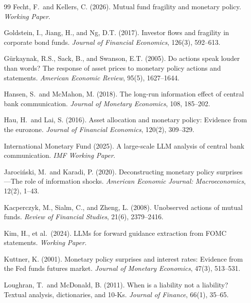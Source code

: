 \documentclass[11pt,a4paper]{article}
\begin{document}
\begin{thebibliography}{99}
Fecht, F.\ and Kellers, C. (2026). Mutual fund fragility and monetary policy. \textit{Working Paper}.

Goldstein, I., Jiang, H., and Ng, D.T. (2017). Investor flows and fragility in corporate bond funds. \textit{Journal of Financial Economics}, 126(3), 592--613.

G\"urkaynak, R.S., Sack, B., and Swanson, E.T. (2005). Do actions speak louder than words? The response of asset prices to monetary policy actions and statements. \textit{American Economic Review}, 95(5), 1627--1644.

Hansen, S.\ and McMahon, M. (2018). The long-run information effect of central bank communication. \textit{Journal of Monetary Economics}, 108, 185--202.

Hau, H.\ and Lai, S. (2016). Asset allocation and monetary policy: Evidence from the eurozone. \textit{Journal of Financial Economics}, 120(2), 309--329.

International Monetary Fund (2025). A large-scale LLM analysis of central bank communication. \textit{IMF Working Paper}.

Jaroci\'nski, M.\ and Karadi, P. (2020). Deconstructing monetary policy surprises---The role of information shocks. \textit{American Economic Journal: Macroeconomics}, 12(2), 1--43.

Kacperczyk, M., Sialm, C., and Zheng, L. (2008). Unobserved actions of mutual funds. \textit{Review of Financial Studies}, 21(6), 2379--2416.

Kim, H., et al.\ (2024). LLMs for forward guidance extraction from FOMC statements. \textit{Working Paper}.

Kuttner, K. (2001). Monetary policy surprises and interest rates: Evidence from the Fed funds futures market. \textit{Journal of Monetary Economics}, 47(3), 513--531.

Loughran, T.\ and McDonald, B. (2011). When is a liability not a liability? Textual analysis, dictionaries, and 10-Ks. \textit{Journal of Finance}, 66(1), 35--65.


\end{thebibliography}
\end{document}

